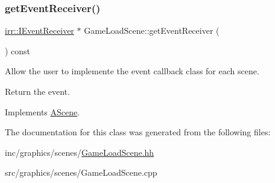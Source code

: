 \subsubsection{\texorpdfstring{get\+Event\+Receiver()}{getEventReceiver()}}
{\footnotesize\ttfamily \hyperlink{classirr_1_1IEventReceiver}{irr\+::\+I\+Event\+Receiver} $\ast$ Game\+Load\+Scene\+::get\+Event\+Receiver (\begin{DoxyParamCaption}{ }\end{DoxyParamCaption}) const\hspace{0.3cm}{\ttfamily [virtual]}}



Allow the user to implemente the event callback class for each scene. 

Return the event. 

Implements \hyperlink{classAScene_af521e5e6d30a5d2e5d30eb333e4d3abd}{A\+Scene}.



The documentation for this class was generated from the following files\+:\begin{DoxyCompactItemize}
\item 
inc/graphics/scenes/\hyperlink{GameLoadScene_8hh}{Game\+Load\+Scene.\+hh}\item 
src/graphics/scenes/Game\+Load\+Scene.\+cpp\end{DoxyCompactItemize}
